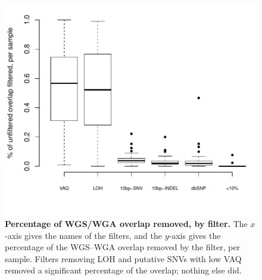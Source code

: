 \documentclass[11pt]{article} %
\begin{document}
\begin{figure}
\centerline{
\includegraphics[width=6in]{boxplot_percent_overlap_filtered.pdf} }
\caption{\textbf{Percentage of WGS/WGA overlap removed, by filter.} The $x$-axis gives the names of the filters, and the $y$-axis gives the percentage of the WGS--WGA overlap removed by the filter, per sample. Filters removing LOH and putative SNVs with low VAQ removed a significant percentage of the overlap; nothing else did.}
\label{fig:boxplot_percent_overlap_filtered}
\end{figure}
\end{document}
